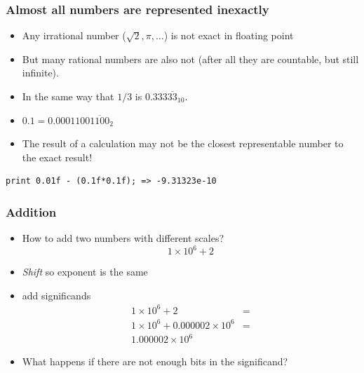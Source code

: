 \documentclass[presentation]{beamer}
\begin{document}
\begin{frame}[fragile]
  \frametitle{Almost all numbers are represented inexactly}
  \begin{itemize}
  \item Any irrational number ($\sqrt{2}, \pi, \dots$) is not exact in
    floating point
  \item But many rational numbers are also not (after all they are
    countable, but still infinite).
  \item In the same way that $1/3$ is $0.333\overline{33}_{10}$.
  \item $0.1 = 0.0001100\overline{1100}_2$
  \item The result of a calculation may not be the closest
    representable number to the exact result!
  \end{itemize}
  \begin{center}
\begin{verbatim}
print 0.01f - (0.1f*0.1f); => -9.31323e-10
\end{verbatim}
  \end{center}
\end{frame}

\begin{frame}
  \frametitle{Addition}
  \begin{itemize}
  \item How to add two numbers with different scales?
    \begin{equation*}
      1 \times 10^{6} + 2
    \end{equation*}
  \item \emph{Shift} so exponent is the same
  \item add significands
    \begin{align*}
      1 \times 10^{6} + 2 &= \\
      1 \times 10^{6} + 0.000002 \times 10^{6} &= \\
      1.000002 \times 10^{6}
    \end{align*}
  \item What happens if there are not enough bits in the significand?
  \end{itemize}
\end{frame}
\end{document}
